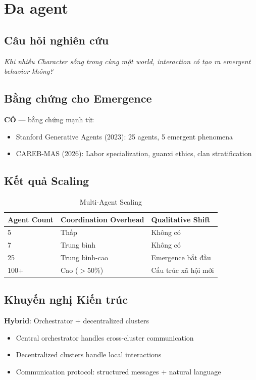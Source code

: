 \section{Đa agent}

\subsection{Câu hỏi nghiên cứu}

\textit{Khi nhiều Character sống trong cùng một world, interaction có tạo ra emergent behavior không?}

\subsection{Bằng chứng cho Emergence}

\textbf{CÓ} --- bằng chứng mạnh từ:
\begin{itemize}
    \item Stanford Generative Agents (2023): 25 agents, 5 emergent phenomena
    \item CAREB-MAS (2026): Labor specialization, guanxi ethics, clan stratification
\end{itemize}

\subsection{Kết quả Scaling}

\begin{table}[H]
\centering
\caption{Multi-Agent Scaling}
\label{tab:multi-agent-scale}
\begin{tabular}{lll}
\toprule
\textbf{Agent Count} & \textbf{Coordination Overhead} & \textbf{Qualitative Shift} \\
\midrule
5 & Thấp & Không có \\
7 & Trung bình & Không có \\
25 & Trung bình-cao & Emergence bắt đầu \\
100+ & Cao ($>$50\%) & Cấu trúc xã hội mới \\
\bottomrule
\end{tabular}
\end{table}

\subsection{Khuyến nghị Kiến trúc}

\textbf{Hybrid}: Orchestrator + decentralized clusters
\begin{itemize}
    \item Central orchestrator handles cross-cluster communication
    \item Decentralized clusters handle local interactions
    \item Communication protocol: structured messages + natural language
\end{itemize}


